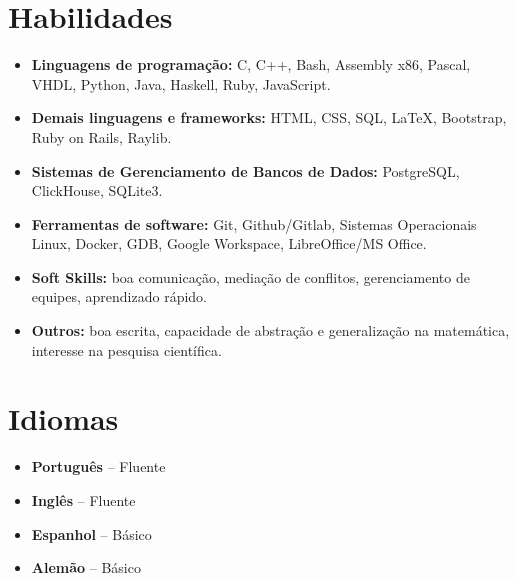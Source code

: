 \documentclass[a4paper, 12pt]{moderncv}
\begin{document}
\section{Habilidades}
\vspace{4pt}
\begin{itemize}
    \item{\textbf{Linguagens de programação:} C, C++, Bash, Assembly x86,
        Pascal, VHDL, Python, Java, Haskell, Ruby, JavaScript.}
    \vspace{4pt}
    \item{\textbf{Demais linguagens e frameworks:} HTML, CSS, SQL, \LaTeX, Bootstrap, Ruby on Rails, Raylib.}
    \vspace{4pt}
    \item{\textbf{Sistemas de Gerenciamento de Bancos de Dados:} PostgreSQL, ClickHouse, SQLite3.}
    \vspace{4pt}
    \item{\textbf{Ferramentas de software:} Git, Github/Gitlab, Sistemas
        Operacionais Linux, Docker, GDB, Google Workspace, LibreOffice/MS
        Office.}
    \vspace{4pt}
    \item{\textbf{Soft Skills:} boa comunicação, mediação de conflitos, gerenciamento
        de equipes, aprendizado rápido.}
    \vspace{4pt}
    \item{\textbf{Outros:} boa escrita, capacidade de abstração e generalização na
        matemática, interesse na pesquisa científica.}
\end{itemize}
\vspace{4pt}

\section{Idiomas}
\vspace{4pt}
\begin{itemize}
    \item{\textbf{Português} -- Fluente}
    \item{\textbf{Inglês} -- Fluente}
    \item{\textbf{Espanhol} -- Básico}
    \item{\textbf{Alemão} -- Básico}
\end{itemize}
\vspace{4pt}
\end{document}
